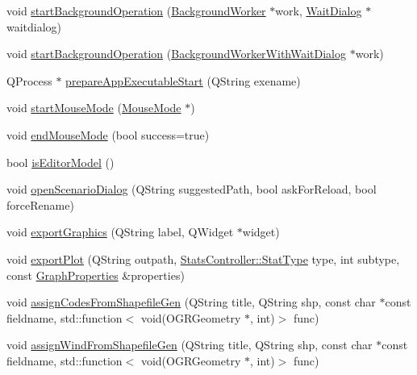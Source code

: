 \begin{DoxyCompactItemize}
\item 
void \mbox{\hyperlink{class_main_window_a998d615ee6326496799ccd038a11205d}{start\+Background\+Operation}} (\mbox{\hyperlink{class_background_worker}{Background\+Worker}} $\ast$work, \mbox{\hyperlink{class_wait_dialog}{Wait\+Dialog}} $\ast$waitdialog)
\item 
void \mbox{\hyperlink{class_main_window_a8801e3a135bddb640a647b698d7adb5c}{start\+Background\+Operation}} (\mbox{\hyperlink{class_background_worker_with_wait_dialog}{Background\+Worker\+With\+Wait\+Dialog}} $\ast$work)
\item 
Q\+Process $\ast$ \mbox{\hyperlink{class_main_window_aa0b7790729f2570bdcada49bf7fda16e}{prepare\+App\+Executable\+Start}} (Q\+String exename)
\item 
void \mbox{\hyperlink{class_main_window_a146371a952a9a6509a88a84d80e49818}{start\+Mouse\+Mode}} (\mbox{\hyperlink{class_mouse_mode}{Mouse\+Mode}} $\ast$)
\item 
void \mbox{\hyperlink{class_main_window_ae52aa3cbb8975b02a8e72bebaa2fa5a8}{end\+Mouse\+Mode}} (bool success=true)
\item 
bool \mbox{\hyperlink{class_main_window_a6c6556ce554be01fc13f9c3a790a5409}{is\+Editor\+Model}} ()
\item 
void \mbox{\hyperlink{class_main_window_a213af3deca59c1500e9f6e2804090b5f}{open\+Scenario\+Dialog}} (Q\+String suggested\+Path, bool ask\+For\+Reload, bool force\+Rename)
\item 
void \mbox{\hyperlink{class_main_window_a7a759f9659acc597509b3a07e66e8343}{export\+Graphics}} (Q\+String label, Q\+Widget $\ast$widget)
\item 
void \mbox{\hyperlink{class_main_window_ad5ae71203bc0a312c21fefc54cc58ec3}{export\+Plot}} (Q\+String outpath, \mbox{\hyperlink{class_stats_controller_a57467d760850639d3b0c55277b7e7ee9}{Stats\+Controller\+::\+Stat\+Type}} type, int subtype, const \mbox{\hyperlink{struct_graph_properties}{Graph\+Properties}} \&properties)
\item 
void \mbox{\hyperlink{class_main_window_aeead8671b7ccdf378f1bd1cd03758718}{assign\+Codes\+From\+Shapefile\+Gen}} (Q\+String title, Q\+String shp, const char $\ast$const fieldname, std\+::function$<$ void(O\+G\+R\+Geometry $\ast$, int)$>$ func)
\item 
void \mbox{\hyperlink{class_main_window_a782b0c19abe0c9e2ab05403f5d50870e}{assign\+Wind\+From\+Shapefile\+Gen}} (Q\+String title, Q\+String shp, const char $\ast$const fieldname, std\+::function$<$ void(O\+G\+R\+Geometry $\ast$, int)$>$ func)

\end{DoxyCompactItemize}
